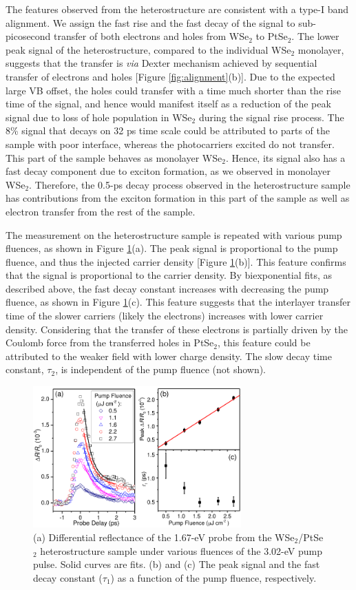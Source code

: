 \documentclass[10pt]{iopart}
\begin{document}
The features observed from the heterostructure are consistent with a type-I band alignment. We assign the fast rise and the fast decay of the signal to sub-picosecond transfer of both electrons and holes from WSe$_2$ to PtSe$_2$. The lower peak signal of the heterostructure, compared to the individual WSe$_2$ monolayer, suggests that the transfer is {\it via} Dexter mechanism \cite{dexter1953theory,murphy2004probing} achieved by sequential transfer of electrons and holes [Figure \ref{fig:alignment}(b)]. Due to the expected large VB offset, the holes could transfer with a time much shorter than the rise time of the signal, and hence would manifest itself as a reduction of the peak signal due to loss of hole population in WSe$_2$ during the signal rise process. The 8\% signal that decays on 32 ps time scale could be attributed to parts of the sample with poor interface, whereas the photocarriers excited do not transfer. This part of the sample behaves as monolayer WSe$_2$. Hence, its signal also has a fast decay component due to exciton formation, as we observed in monolayer WSe$_2$. Therefore, the 0.5-ps decay process observed in the heterostructure sample has contributions from the exciton formation in this part of the sample as well as electron transfer from the rest of the sample.

The measurement on the heterostructure sample is repeated with various pump fluences, as shown in Figure \ref{fig:power}(a). The peak signal is proportional to the pump fluence, and thus the injected carrier density [Figure \ref{fig:power}(b)]. This feature confirms that the signal is proportional to the carrier density. By biexponential fits, as described above, the fast decay constant increases with decreasing the pump fluence, as shown in Figure \ref{fig:power}(c). This feature suggests that the interlayer transfer time of the slower carriers (likely the electrons) increases with lower carrier density. Considering that the transfer of these electrons is partially driven by the Coulomb force from the transferred holes in PtSe$_2$, this feature could be attributed to the weaker field with lower charge density. The slow decay time constant, $\tau_2$, is independent of the pump fluence (not shown).


\begin{figure}[ht!]
  \centering
  \includegraphics[width=8cm]{power.pdf}
  \caption{(a) Differential reflectance of the 1.67-eV probe from the WSe$_2$/PtSe$_2$ heterostructure sample under various fluences of the 3.02-eV pump pulse. Solid curves are fits. (b) and (c) The peak signal and the fast decay constant ($\tau_1$) as a function of the pump fluence, respectively.}
    \label{fig:power}
\end{figure}
\end{document}
